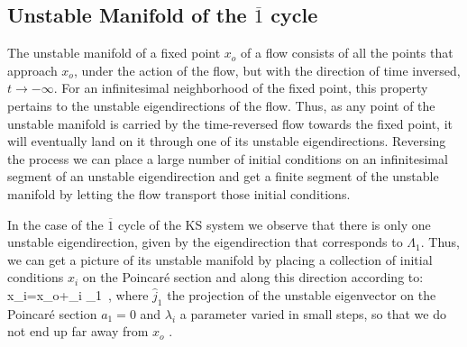 \documentclass[pre,preprint,groupedaddress,showpacs,showkeys]{revtex4}
\begin{document}
\subsection{Unstable Manifold of the $ \overline{1}$   cycle \label{sec:UnstableManifold}}

 The unstable manifold of a fixed point $x_o$ of a flow consists of all the
 points that approach $x_o$, under the action of the flow, but with the
 direction of time inversed, $t\rightarrow -\infty$. For an infinitesimal neighborhood of the
 fixed point, this property pertains to the unstable eigendirections of the
 flow. Thus, as any point of the unstable manifold is carried by the
 time-reversed flow towards the fixed point, it will eventually land
 on it through one of its unstable eigendirections. Reversing the
 process we can place a large number of initial conditions on an
 infinitesimal segment of an unstable eigendirection and get a finite
 segment of the unstable manifold by letting the flow transport those
 initial conditions.

 In the case of the  $ \overline{1}$ cycle of the KS system we observe
 that there is only one unstable eigendirection, given by the
 eigendirection that corresponds to $\Lambda_1$. Thus, we can get a
 picture of its unstable manifold by placing a collection of
 initial conditions $x_i$ on the Poincar\'e section and along
 this direction according to:
 \beq
  x_i=x_o+\lambda_i _1\, ,
  \label{eq:unstable initialization}
 \eeq
 where $\hat{j}_1$ the projection of the unstable eigenvector on the
 Poincar\'e section $a_1=0$ and $\lambda_i$ a
 parameter varied in small steps, so that we do not end up far away
 from $x_o$
 .
\end{document}

